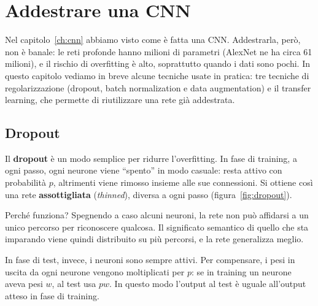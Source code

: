 \chapter{Addestrare una CNN}\label{ch:addestramento-cnn}
Nel capitolo~\ref{ch:cnn} abbiamo visto come è fatta una CNN. Addestrarla, però, non è banale: le reti profonde hanno milioni di parametri (AlexNet ne ha circa 61 milioni), e il rischio di overfitting è alto, soprattutto quando i dati sono pochi. In questo capitolo vediamo in breve alcune tecniche usate in pratica: tre tecniche di regolarizzazione (dropout, batch normalization e data augmentation) e il transfer learning, che permette di riutilizzare una rete già addestrata.

\section{Dropout}
Il \textbf{dropout} \cite{Srivastava2014} è un modo semplice per ridurre l'overfitting. In fase di training, a ogni passo, ogni neurone viene ``spento'' in modo casuale: resta attivo con probabilità $p$, altrimenti viene rimosso insieme alle sue connessioni. Si ottiene così una rete \textbf{assottigliata} (\emph{thinned}), diversa a ogni passo (figura~\ref{fig:dropout}).

Perché funziona? Spegnendo a caso alcuni neuroni, la rete non può affidarsi a un unico percorso per riconoscere qualcosa. Il significato semantico di quello che sta imparando viene quindi distribuito su più percorsi, e la rete generalizza meglio.

In fase di test, invece, i neuroni sono sempre attivi. Per compensare, i pesi in uscita da ogni neurone vengono moltiplicati per $p$: se in training un neurone aveva pesi $w$, al test usa $pw$. In questo modo l'output al test è uguale all'output atteso in fase di training.

